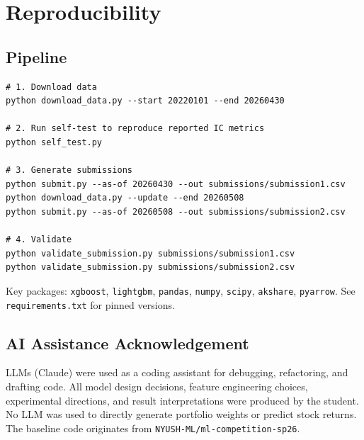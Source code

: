 \documentclass[11pt,a4paper]{article}
\begin{document}
\section{Reproducibility}

\subsection{Pipeline}

\begin{verbatim}
# 1. Download data
python download_data.py --start 20220101 --end 20260430

# 2. Run self-test to reproduce reported IC metrics
python self_test.py

# 3. Generate submissions
python submit.py --as-of 20260430 --out submissions/submission1.csv
python download_data.py --update --end 20260508
python submit.py --as-of 20260508 --out submissions/submission2.csv

# 4. Validate
python validate_submission.py submissions/submission1.csv
python validate_submission.py submissions/submission2.csv
\end{verbatim}

Key packages: \texttt{xgboost}, \texttt{lightgbm}, \texttt{pandas},
\texttt{numpy}, \texttt{scipy}, \texttt{akshare}, \texttt{pyarrow}.
See \texttt{requirements.txt} for pinned versions.

\subsection{AI Assistance Acknowledgement}

LLMs (Claude) were used as a coding assistant for debugging, refactoring,
and drafting code. All model design decisions, feature engineering choices,
experimental directions, and result interpretations were produced by the
student. No LLM was used to directly generate portfolio weights or predict
stock returns. The baseline code originates from
\texttt{NYUSH-ML/ml-competition-sp26}.
\end{document}
